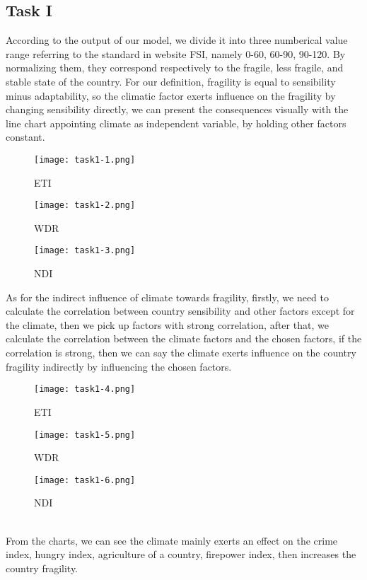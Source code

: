 \documentclass{mcmthesis}
\begin{document}
\subsection{Task I}
According to the output of our model, we divide it into 
three numberical value range referring to the standard in website 
FSI, namely 0-60, 60-90, 90-120. By normalizing them, they 
correspond respectively to the fragile, less fragile, and stable 
state of the country. For our definition, fragility is equal to 
sensibility minus adaptability, so the climatic factor exerts 
influence on the fragility by changing sensibility directly, 
we can present the consequences visually with the line chart 
appointing climate as independent variable, by holding other 
factors constant. 
\begin{figure}[h]
  \centering
  \begin{minipage}[h]{0.3\textwidth}
  \centering
  \texttt{[image: task1-1.png]}
  \caption{ETI}
  \end{minipage}
  \begin{minipage}[h]{0.3\textwidth}
  \centering
  \texttt{[image: task1-2.png]}
  \caption{WDR}
  \end{minipage}    
  \begin{minipage}[h]{0.3\textwidth}
  \centering
  \texttt{[image: task1-3.png]}
  \caption{NDI}
  \end{minipage}  
\end{figure}
As for the indirect influence of climate towards 
fragility, firstly, we need to calculate the correlation between 
country sensibility and other factors except for the climate, then 
we pick up factors with strong correlation, after that, we 
calculate the correlation between the climate factors and the 
chosen factors, if the correlation is strong, then we can say 
the climate exerts influence on the country fragility indirectly 
by influencing the chosen factors.
\begin{figure}[h]
  \centering
  \begin{minipage}[h]{0.3\textwidth}
  \centering
  \texttt{[image: task1-4.png]}
  \caption{ETI}
  \end{minipage}
  \begin{minipage}[h]{0.3\textwidth}
  \centering
  \texttt{[image: task1-5.png]}
  \caption{WDR}
  \end{minipage}    
  \begin{minipage}[h]{0.3\textwidth}
  \centering
  \texttt{[image: task1-6.png]}
  \caption{NDI}
  \end{minipage}  
\end{figure}\\
From the charts, we can see the climate mainly exerts 
an effect on the crime index, hungry index, agriculture of 
a country, firepower index, then increases the 
country fragility.
\end{document}
